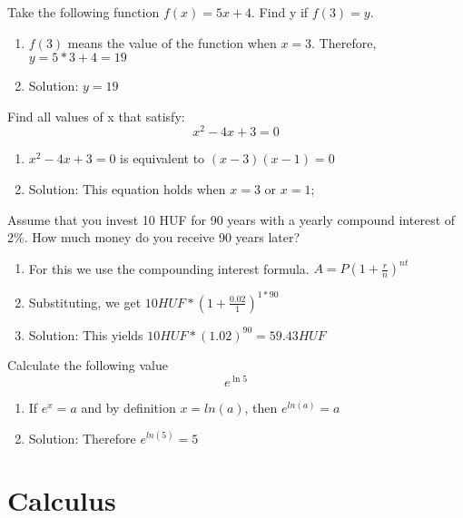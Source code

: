 \documentclass[10pt]{article}
\newenvironment{problem}[2][Problem]{\begin{trivlist}
\item[\hskip \labelsep {\bfseries #1}\hskip \labelsep {\bfseries #2.}]}{\end{trivlist}}
\begin{document}
\begin{problem}{2.2}
Take the following function $f(x)=5x+4$. Find y if $f(3)=y$.

\begin{enumerate}
    \item $f(3)$ means the value of the function when $x = 3$. Therefore, $y = 5 * 3 + 4 = 19$
    \item Solution: $y = 19$
\end{enumerate}
\end{problem}

\begin{problem}{2.3}
Find all values of x that satisfy:
$$x^2-4x+3=0$$

\begin{enumerate}
    \item $x^2-4x+3=0$ is equivalent to $(x - 3)(x - 1) = 0$
    \item Solution: This equation holds when $x = 3$ or $x = 1$;
\end{enumerate}
\end{problem}

\begin{problem}{2.4}
Assume that you invest 10 HUF for 90 years with a yearly compound interest of 2\%. How much money do you receive 90 years later?

\begin{enumerate}
    \item For this we use the compounding interest formula. $A = P (1 + \frac{r}{n})^{nt}$
    \item Substituting, we get $10 HUF * (1 + \frac{0.02}{1})^{1*90}$
    \item Solution: This yields $10 HUF * (1.02)^{90} = 59.43 HUF$
\end{enumerate}
\end{problem}

\begin{problem}{2.5}
Calculate the following value
$$e^{\ln 5}$$

\begin{enumerate}
\item If $e^x=a$ and by definition $x = ln(a)$, then $e^{ln(a)} = a$
\item Solution: Therefore $e^{ln(5)} = 5$
\end{enumerate}
\end{problem}

\section{Calculus}
\end{document}
